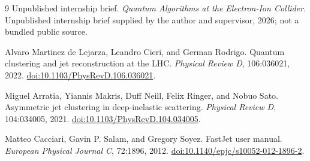 \documentclass[11pt]{article}
\begin{document}
\begin{thebibliography}{9}
Unpublished internship brief.
\newblock \emph{Quantum Algorithms at the Electron-Ion Collider}.
\newblock Unpublished internship brief supplied by the author and supervisor, 2026; not a bundled public source.

Alvaro Martinez de Lejarza, Leandro Cieri, and German Rodrigo.
\newblock Quantum clustering and jet reconstruction at the LHC.
\newblock \emph{Physical Review D}, 106:036021, 2022.
\newblock \href{https://doi.org/10.1103/PhysRevD.106.036021}{doi:10.1103/PhysRevD.106.036021}.

Miguel Arratia, Yiannis Makris, Duff Neill, Felix Ringer, and Nobuo Sato.
\newblock Asymmetric jet clustering in deep-inelastic scattering.
\newblock \emph{Physical Review D}, 104:034005, 2021.
\newblock \href{https://doi.org/10.1103/PhysRevD.104.034005}{doi:10.1103/PhysRevD.104.034005}.

Matteo Cacciari, Gavin P. Salam, and Gregory Soyez.
\newblock FastJet user manual.
\newblock \emph{European Physical Journal C}, 72:1896, 2012.
\newblock \href{https://doi.org/10.1140/epjc/s10052-012-1896-2}{doi:10.1140/epjc/s10052-012-1896-2}.
\end{thebibliography}
\end{document}

